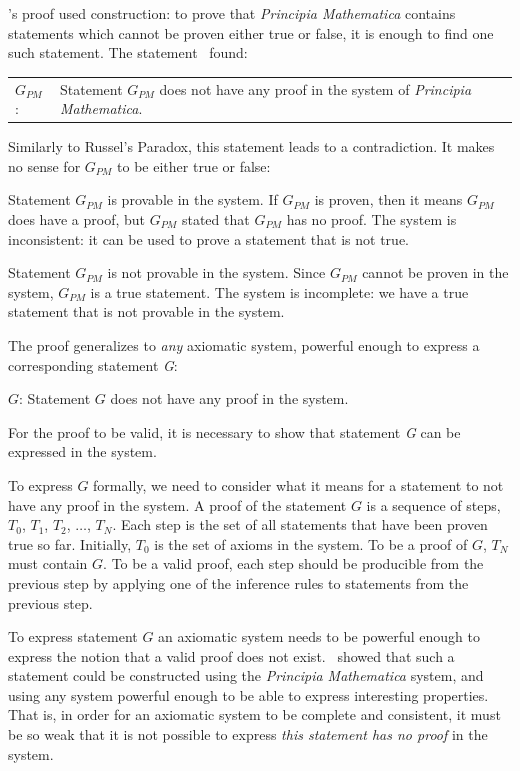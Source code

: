 \begin{schemeregion}
\Godel's proof used construction: to prove that \emph{Principia Mathematica} contains statements which cannot be proven either true or false, it is enough to find one such statement. The statement \Godel\ found:
\begin{smallquote}
\begin{tabular}{p{2em}p{24em}}
$G_{PM}$: & {\raggedright Statement $G_{PM}$ does not have any proof in the system of \emph{Principia Mathematica}.} \tabularnewline
\end{tabular}
\end{smallquote}

Similarly to Russel's Paradox, this statement leads to a contradiction.  It makes no sense for $G_{PM}$ to be either true or false:
\begin{descriptionlist}
\item[Statement $G_{PM}$ is provable in the system.]\forcenl
If $G_{PM}$ is proven, then it means $G_{PM}$ does have a proof, but $G_{PM}$ stated that $G_{PM}$ has no proof.  The system is inconsistent: it can be used to prove a statement that is not true.  
\item[Statement $G_{PM}$ is not provable in the system.]\forcenl
Since $G_{PM}$ cannot be proven in the system, $G_{PM}$ is a true statement.  The system is incomplete: we have a true statement that is not provable in the system.
\end{descriptionlist}

The proof generalizes to \emph{any} axiomatic system, powerful enough to express a corresponding statement \emph{G}:
\begin{smallquote}
$G$: Statement $G$ does not have any proof in the system.
\end{smallquote}
For the proof to be valid, it is necessary to show that statement \emph{G} can be expressed in the system.  

To express $G$ formally, we need to consider what it means for a statement to not have any proof in the system.  A proof of the statement $G$ is a sequence of steps, $T_0$, $T_1$, $T_2$, $\ldots$, $T_N$. Each step is the set of all statements that have been proven true so far.  Initially, $T_0$ is the set of axioms in the system.  To be a proof of $G$, $T_N$ must contain $G$.  To be a valid proof, each step should be producible from the previous step by applying one of the inference rules to statements from the previous step.  

To express statement $G$ an axiomatic system needs to be powerful enough to express the notion that a valid proof does not exist.  \Godel\ showed that such a statement could be constructed using the \emph{Principia Mathematica} system, and using any system powerful enough to be able to express interesting properties.  That is, in order for an axiomatic system to be complete and consistent, it must be so weak that it is not possible to express \emph{this statement has no proof} in the system.


\end{schemeregion}
